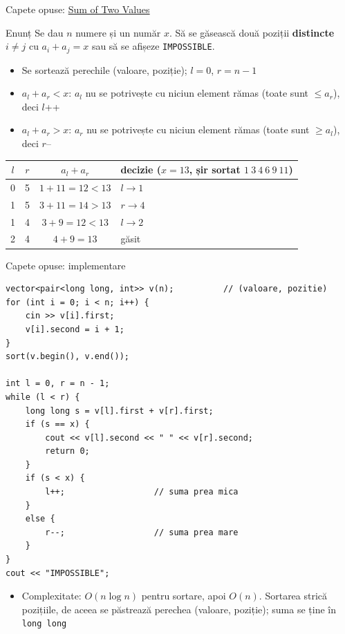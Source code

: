\documentclass[8pt,mathserif]{beamer}
\begin{document}
\begin{frame}{Capete opuse: \href{https://cses.fi/problemset/task/1640}{Sum of Two Values} }
  \begin{exampleblock}{Enunț}
    Se dau $n$ numere și un număr $x$. Să se găsească două poziții \textbf{distincte} $i \ne j$ cu $a_i + a_j = x$ sau să se afișeze \texttt{IMPOSSIBLE}.
  \end{exampleblock}
  \begin{itemize}
    \item Se sortează perechile (valoare, poziție); $l = 0$, $r = n-1$
    \item $a_l + a_r < x$: $a_l$ nu se potrivește cu niciun element rămas (toate sunt $\le a_r$), deci $l$++
    \item $a_l + a_r > x$: $a_r$ nu se potrivește cu niciun element rămas (toate sunt $\ge a_l$), deci $r$--
  \end{itemize}
  \smallskip
  \centering
  \renewcommand{\arraystretch}{1.15}
  \begin{tabular}{@{}cccl@{}}
    \toprule
    $l$ & $r$ & $a_l + a_r$ & decizie ($x = 13$, șir sortat $1\ 3\ 4\ 6\ 9\ 11$) \\
    \midrule
    0 & 5 & $1 + 11 = 12 < 13$ & $l \to 1$ \\
    1 & 5 & $3 + 11 = 14 > 13$ & $r \to 4$ \\
    1 & 4 & $3 + 9 = 12 < 13$ & $l \to 2$ \\
    2 & 4 & $4 + 9 = 13$ & găsit \\
    \bottomrule
  \end{tabular}
\end{frame}

\begin{frame}[fragile]{Capete opuse: implementare}
  \lstset{lineskip=1pt}
  \begin{lstlisting}
vector<pair<long long, int>> v(n);          // (valoare, pozitie)
for (int i = 0; i < n; i++) {
    cin >> v[i].first;
    v[i].second = i + 1;
}
sort(v.begin(), v.end());

int l = 0, r = n - 1;
while (l < r) {
    long long s = v[l].first + v[r].first;
    if (s == x) {
        cout << v[l].second << " " << v[r].second;
        return 0;
    }
    if (s < x) {
        l++;                  // suma prea mica
    }
    else {
        r--;                  // suma prea mare
    }
}
cout << "IMPOSSIBLE";
  \end{lstlisting}
  \begin{itemize}
    \item Complexitate: $O(n \log n)$ pentru sortare, apoi $O(n)$. Sortarea strică pozițiile, de aceea se păstrează perechea (valoare, poziție); suma se ține în \texttt{long long}
  \end{itemize}
\end{frame}
\end{document}
